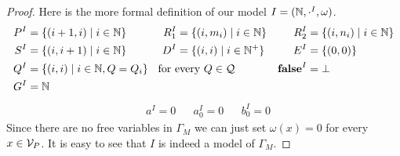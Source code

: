 \begin{proof}
	Here is the more formal definition of our model $I=(\mathbb{N},\cdot^I,\omega)$.
	\begin{align*}
		  P^I&=\{(i+1,i)\mid i\in\N\}              & R_1^I&=\{(i,m_i)\mid i\in\N\} & R_2^I&=\{(i,n_i)\mid i\in\N\} \\
		  S^I&=\{(i,i+1)\mid i\in\N\} &  D^I&=\{(i,i)\mid i\in\N^+\}         & E^I&=\{(0,0)\}                            \\
		  Q^I&=\{(i,i)\mid i\in\N, Q=Q_i\} \makebox[1mm]{\hspace{3cm}\text{for every $Q\in\autStates$}}& && \false^I&=\bot \\
		  G^I&=\N
	\end{align*}
	\begin{align*}
		  & a^I=0 &   & a_0^I=0 &   & b_0^I=0 
	\end{align*}
	Since there are no free variables in $\Gamma_M$ we can just set $\omega(x)=0$ for every $x\in\mathcal{V}_P$. It is easy to see that $I$ is indeed a model of $\Gamma_M$.
\end{proof}

